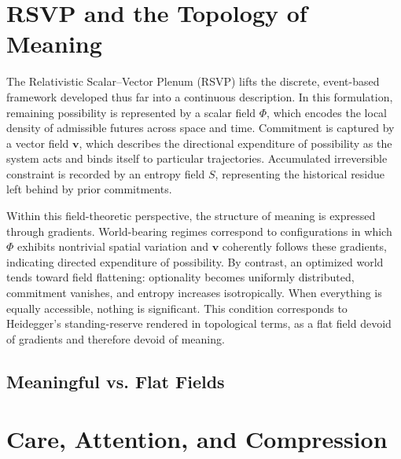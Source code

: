 \documentclass[11pt]{article}
\begin{document}
\section{RSVP and the Topology of Meaning}

The Relativistic Scalar–Vector Plenum (RSVP) lifts the discrete, event-based framework developed thus far into a continuous description. In this formulation, remaining possibility is represented by a scalar field $\Phi$, which encodes the local density of admissible futures across space and time. Commitment is captured by a vector field $\mathbf{v}$, which describes the directional expenditure of possibility as the system acts and binds itself to particular trajectories. Accumulated irreversible constraint is recorded by an entropy field $S$, representing the historical residue left behind by prior commitments.

Within this field-theoretic perspective, the structure of meaning is expressed through gradients. World-bearing regimes correspond to configurations in which $\Phi$ exhibits nontrivial spatial variation and $\mathbf{v}$ coherently follows these gradients, indicating directed expenditure of possibility. By contrast, an optimized world tends toward field flattening: optionality becomes uniformly distributed, commitment vanishes, and entropy increases isotropically. When everything is equally accessible, nothing is significant. This condition corresponds to Heidegger’s standing-reserve rendered in topological terms, as a flat field devoid of gradients and therefore devoid of meaning.


\subsection*{Meaningful vs. Flat Fields}

\begin{center}
\end{center}

\section{Care, Attention, and Compression}
\end{document}
